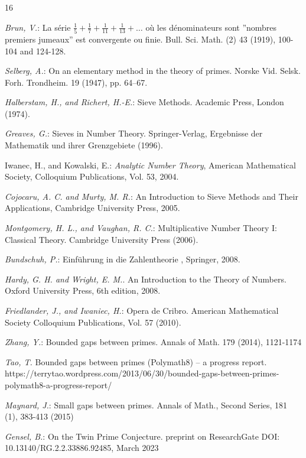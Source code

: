 \documentclass[fmeq,reqno]{amsart}
\theoremstyle{definition}
\theoremstyle{remark}
\numberwithin{equation}{section}
\begin{document}
\begin{thebibliography}{16}

\textit{Brun, V.}:
La s\'{e}rie $\frac{1}{5}+\frac{1}{7}+\frac{1}{11}+\frac{1}{13}+\ldots$ o\`{u} les d\'{e}nominateurs sont ''nombres premiers jumeaux'' est convergente ou finie. Bull. Sci. Math. (2) 43 (1919), 100-104 and 124-128.

\textit{Selberg, A.}:
On an elementary method in the theory of primes.
Norske Vid. Selsk. Forh. Trondheim. 19 (1947), pp. 64–67.

\textit{Halberstam, H., and Richert, H.-E.}:
Sieve Methods.
Academic Press, London (1974).

\textit{Greaves, G.}:
Sieves in Number Theory.
Springer-Verlag, Ergebnisse der Mathematik und ihrer Grenzgebiete (1996).

Iwanec, H., and Kowalski, E.:
\textit{Analytic Number Theory},
American Mathematical Society, Colloquium Publications, Vol. 53, 2004.

\textit{Cojocaru, A. C. and Murty, M. R.}: 
An Introduction to Sieve Methods and Their Applications, Cambridge University Press, 2005.

\textit{Montgomery, H. L., and Vaughan, R. C.}:
Multiplicative Number Theory I: Classical Theory.
Cambridge University Press (2006).

\textit{Bundschuh, P.}:
Einf\"uhrung in die Zahlentheorie , Springer, 2008.

\textit{Hardy, G. H. and Wright, E. M.}.
An Introduction to the Theory of Numbers.
Oxford University Press, 6th edition, 2008.

\textit{Friedlander, J., and Iwaniec, H.}:
Opera de Cribro.
American Mathematical Society Colloquium Publications, Vol. 57 (2010).

\textit{Zhang, Y.}: 
Bounded gaps between primes. Annals of Math. 179 (2014), 1121-1174

\textit{Tao, T.}
Bounded gaps between primes (Polymath8) – a progress report.\\
https://terrytao.wordpress.com/2013/06/30/bounded-gaps-between-primes-polymath8-a-progress-report/

\textit{Maynard, J.}: 
Small gaps between primes. Annals of Math., Second Series, 181 (1), 383-413 (2015)

\textit{Gensel, B.}: 
On the Twin Prime Conjecture. preprint on ResearchGate DOI: 10.13140/RG.2.2.33886.92485, March 2023 

\end{thebibliography}
\end{document}

